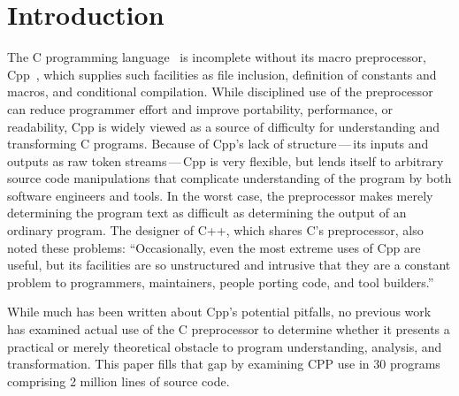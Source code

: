 \documentclass[10pt]{article}
\def\numpackages{30}
\def\numlines{2 million}
\begin{document}
\bigskip

\section{Introduction}

The C programming language~\cite{ansi} is incomplete without its macro
preprocessor, Cpp~\cite[Ch.~3]{Harbison91}, which supplies such facilities
as file inclusion, definition of constants and macros, and conditional
compilation.  While disciplined use of the preprocessor can reduce
programmer effort and improve portability, performance, or readability, Cpp
is widely viewed as a source of difficulty for understanding and
transforming C programs.  Because of Cpp's lack of structure\,---\,its
inputs and outputs as raw token streams\,---\,Cpp is very flexible, but
lends itself to arbitrary source code manipulations that complicate
understanding of the program by both software engineers and tools.  In the
worst case, the preprocessor makes merely determining the program text as
difficult as determining the output of an ordinary program.  The designer
of C++, which shares C's preprocessor, also noted these problems:
``Occasionally, even the most extreme uses of Cpp are useful, but its
facilities are so unstructured and intrusive that they are a constant
problem to programmers, maintainers, people porting code, and tool
builders.''~\cite[p.~424]{Stroustrup-DesignEvolution}

While much has been written about Cpp's potential pitfalls, no previous
work has examined actual use of the C preprocessor to determine whether it
presents a practical or merely theoretical obstacle to program
understanding, analysis, and transformation.  This paper fills that gap by
examining CPP use in {\numpackages} programs comprising {\numlines} lines
of source code.
\end{document}
